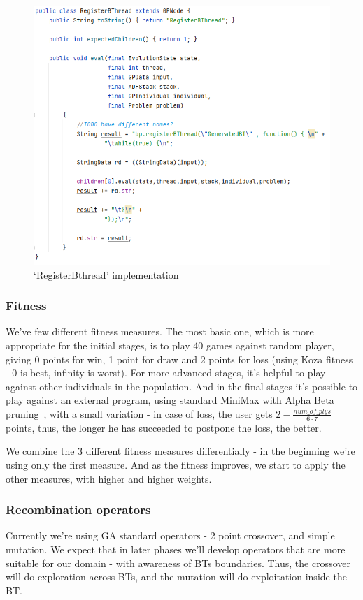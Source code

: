 \documentclass{article}
\begin{document}
    \begin{figure}[htbp]
        \includegraphics[width=\textwidth]{ecj-bt}
        \caption{`RegisterBthread' implementation}
        \label{fig:ecjc-bt}
    \end{figure}


    \subsubsection{Fitness}
    We've few different fitness measures. The most basic one, which is more appropriate for the initial stages, is to play
    40 games against random player,
    giving 0 points for win, 1 point for draw and 2 points for loss (using Koza fitness - 0 is best, infinity is
    worst).
    For more advanced stages, it's helpful to play against other individuals in the population.
    And in the final stages it's possible to play against an external program, using standard MiniMax with Alpha Beta
    pruning~\cite{Scott}, with a small variation - in case of loss, the user gets \(2-\frac{num\_of\_plys}{6\cdot 7}\)
    points, thus, the longer he has succeeded to postpone the loss, the better.

    We combine the 3 different fitness measures differentially - in the beginning we're using only the first measure. And
    as the fitness improves, we start to apply the other measures, with higher and higher weights.

    \subsubsection{Recombination operators}
    Currently we're using GA standard operators - 2 point crossover, and simple mutation.
    We expect that in later phases we'll develop operators that are more suitable for our domain - with awareness
    of BTs boundaries. Thus, the crossover will do exploration across BTs, and the mutation will do exploitation inside
    the BT.

    \FloatBarrier

    \printbibliography
\end{document}
